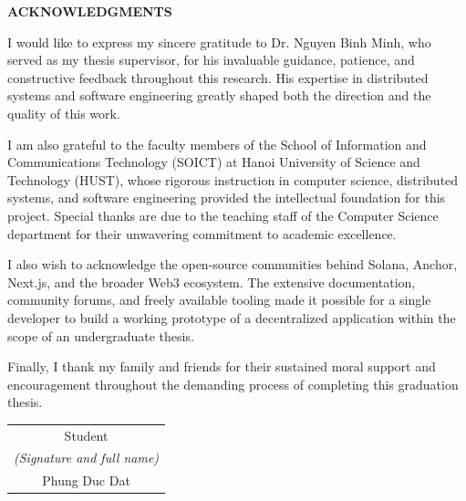 \begin{center}
    \Large{\textbf{ACKNOWLEDGMENTS}}
\end{center}
\vspace{1cm}

I would like to express my sincere gratitude to Dr. Nguyen Binh Minh, who served as my thesis supervisor, for his invaluable guidance, patience, and constructive feedback throughout this research. His expertise in distributed systems and software engineering greatly shaped both the direction and the quality of this work.

I am also grateful to the faculty members of the School of Information and Communications Technology (SOICT) at Hanoi University of Science and Technology (HUST), whose rigorous instruction in computer science, distributed systems, and software engineering provided the intellectual foundation for this project. Special thanks are due to the teaching staff of the Computer Science department for their unwavering commitment to academic excellence.

I also wish to acknowledge the open-source communities behind Solana, Anchor, Next.js, and the broader Web3 ecosystem. The extensive documentation, community forums, and freely available tooling made it possible for a single developer to build a working prototype of a decentralized application within the scope of an undergraduate thesis.

Finally, I thank my family and friends for their sustained moral support and encouragement throughout the demanding process of completing this graduation thesis.

\begin{flushright}
\begin{tabular}{@{}c@{}}
Student\\
\textit{(Signature and full name)}\\[1cm]
Phung Duc Dat
\end{tabular}
\end{flushright}
